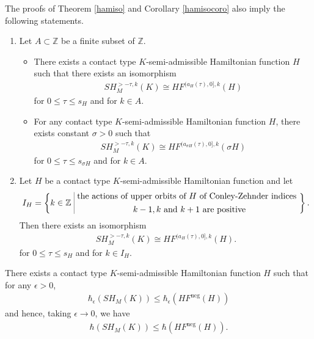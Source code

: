 \documentclass[10pt,a4paper]{amsart}
\def\bigmid{\ \rule[-3.5mm]{0.1mm}{9mm}\ }
\newcommand{\ZZ}{{\mathbb Z}}
\begin{document}
\begin{remark}\label{rmk1}
The proofs of Theorem \ref{hamiso} and Corollary \ref{hamisocoro} also imply the following statements.
\begin{enumerate}[label=(\alph*)]
    \item Let $A \subset \ZZ$ be a finite subset of $\ZZ$. \vspace{0.2cm}
    \begin{itemize}
       \item There exists a contact type $K$-semi-admissible Hamiltonian function $H$ such that there exists an isomorphism
    \begin{align*}
        SH^{>-\tau,k}_M(K) \cong HF^{(a_{H}(\tau),0],k}(H)
    \end{align*}
    for $0 \leq \tau \leq s_H$ and for $k \in A$. \vspace{0.2cm}
    \item For any contact type $K$-semi-admissible Hamiltonian function $H$, there exists constant $\sigma >0$ such that
    \begin{align*}
         SH^{>-\tau,k}_M(K) \cong HF^{(a_{\sigma H}(\tau),0],k}(\sigma H)
    \end{align*}
    for $0 \leq \tau \leq s_{\sigma H}$ and for $k \in A$.\vspace{0.2cm}
    \end{itemize}
    \item Let $H$ be a contact type $K$-semi-admissible Hamiltonian function and let
    \begin{align*}
        I_H = \left\{ k \in \ZZ \bigmid \substack{ \textstyle \text{the actions of upper orbits of } H \text{ of Conley-Zehnder indices } $\vspace{0.2cm}$\\ 
             \,\,\textstyle k-1, k \text{ and } k+1 \text{ are positive}} \right\}.
    \end{align*}
    Then there exists an isomorphism 
    \begin{align*}
        SH_M^{>-\tau,k}(K) \cong HF^{(a_{H}(\tau),0],k}(H).
    \end{align*}
    for $0\leq\tau\leq s_H$ and for $k \in I_H$.
   \end{enumerate}
       \end{remark}

\begin{theorem}\label{rene}
    There exists a contact type $K$-semi-admissible Hamiltonian function $H$ such that for any $\epsilon>0$, 
         \begin{align*}
       \hbar_{\epsilon}(SH_M(K)) \leq \hbar_{\epsilon}(HF^{\textrm{neg}}(H))
    \end{align*}
    and hence, taking $\epsilon \to 0$, we have  
    \begin{align*}
       \hbar(SH_M(K)) \leq \hbar(HF^{\textrm{neg}}(H)).
        \end{align*}
  
    
\end{theorem}
\end{document}
